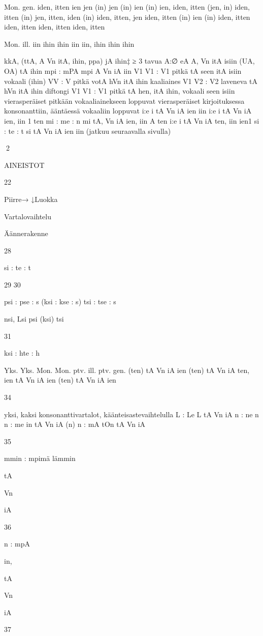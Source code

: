 \documentclass[free]{flammie}
\begin{document}
\begin{table}
Mon.
gen.
iden, itten
ien
jen (in)
jen (in)
ien (in)
ien, iden,
itten
(jen, in)
iden,
itten (in)
jen,
itten,
iden (in)
iden,
itten,
jen
iden,
itten (in)
ien (in)
iden,
itten
iden,
itten
iden,
itten
iden,
itten

Mon.
ill.
iin
ihin
ihin
iin
iin,
ihin
ihin
ihin

kkA, (ttA, A
Vn
itA,
ihin,
ppa)
jA
ihin‡
≥ 3 tavua
A:∅
eA
A,
Vn
itA
isiin
(UA, OA) tA
ihin
mpi : mPA
mpi
A
Vn
iA
iin
V1 V1 : V1
pitkä
tA
seen itA
isiin
vokaali
(ihin)
VV : V
pitkä votA
hVn itA
ihin
kaaliaines
V1 V2 : V2
laveneva
tA
hVn itA
ihin
diftongi
V1 V1 : V1
pitkä
tA
hen, itA
ihin,
vokaali
seen
isiin
vierasperäiset pitkään vokaaliainekseen loppuvat
vierasperäiset kirjoituksessa konsonanttiin, ääntäessä vokaaliin loppuvat
i:e
i
tA
Vn
iA
ien
iin
i:e
i
tA
Vn
iA
ien,
iin
1
ten
mi : me : n
mi
tA,
Vn
iA
ien,
iin
A
ten
i:e
i
tA
Vn
iA
ten,
iin
ien1
si : te : t
si
tA
Vn
iA
ien
iin
(jatkuu seuraavalla sivulla)

2

AINEISTOT

22

Piirre→
↓Luokka

Vartalovaihtelu

Äännerakenne

28

si : te : t

29
30

psi : pse : s
(ksi : kse : s)
tsi : tse : s

nsi,
Lsi
psi
(ksi)
tsi

31

ksi : hte : h

Yks. Yks. Mon. Mon.
ptv. ill.
ptv.
gen.
(ten)
tA
Vn
iA
ien
(ten)
tA
Vn
iA
ten,
ien
tA
Vn
iA
ien
(ten)
tA
Vn
iA
ien

34

yksi,
kaksi
konsonanttivartalot, käänteisastevaihtelulla
L : Le
L
tA
Vn
iA
n : ne
n
n : me
in
tA
Vn
iA
(n)
n : mA
tOn
tA
Vn
iA

35

mmin : mpimä lämmin

tA

Vn

iA

36

n : mpA

in,

tA

Vn

iA

37


\end{table}
\end{document}
